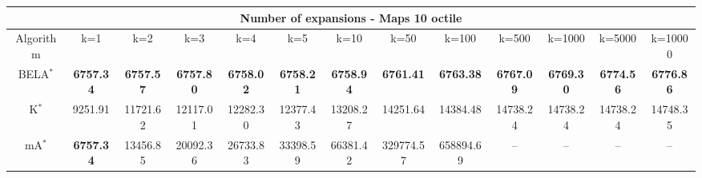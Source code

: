 \begin{tabular}{c|cccccccccccc}\toprule
\multicolumn{13}{c}{Number of expansions - Maps 10 octile}\\ \midrule
Algorithm & k=1 & k=2 & k=3 & k=4 & k=5 & k=10 & k=50 & k=100 & k=500 & k=1000 & k=5000 & k=10000 \\ \midrule
BELA$^*$ & \textbf{6757.34} & \textbf{6757.57} & \textbf{6757.80} & \textbf{6758.02} & \textbf{6758.21} & \textbf{6758.94} & \textbf{6761.41} & \textbf{6763.38} & \textbf{6767.09} & \textbf{6769.30} & \textbf{6774.56} & \textbf{6776.86} \\
K$^*$ & 9251.91 & 11721.62 & 12117.01 & 12282.30 & 12377.43 & 13208.27 & 14251.64 & 14384.48 & 14738.24 & 14738.24 & 14738.24 & 14748.35 \\
mA$^*$ & \textbf{6757.34} & 13456.85 & 20092.36 & 26733.83 & 33398.59 & 66381.42 & 329774.57 & 658894.69 & -- & -- & -- & -- \\ \bottomrule 
\end{tabular}
